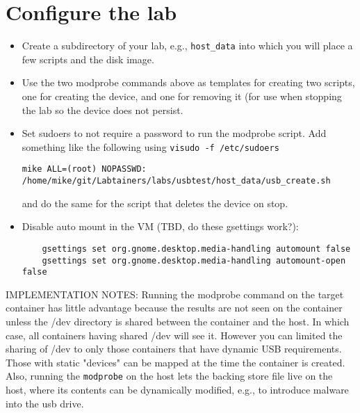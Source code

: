 \documentclass[12pt]{article}
\begin{document}
\section{Configure the lab}
\begin{itemize}
\item Create a subdirectory of your lab, e.g., {\tt host\_data} into which you will place a few scripts and the disk image.
\item Use the two modprobe commands above as templates for creating two scripts, one for creating the device, and one for removing it (for use
when stopping the lab so the device does not persist.
\item Set sudoers to not require a password to run the modprobe script.  Add
something like the following using {\tt visudo -f /etc/sudoers}
\begin{verbatim}
mike ALL=(root) NOPASSWD: /home/mike/git/Labtainers/labs/usbtest/host_data/usb_create.sh
\end{verbatim}
\noindent and do the same for the script that deletes the device on stop.

\item Disable auto mount in the VM (TBD, do these gsettings work?):
\begin{verbatim}
    gsettings set org.gnome.desktop.media-handling automount false
    gsettings set org.gnome.desktop.media-handling automount-open false 
\end{verbatim}

\end{itemize}

IMPLEMENTATION NOTES:   Running the modprobe command on the target container has little advantage because the results
are not seen on the container unless the /dev directory is shared between the container and the host.  In which case,
all containers having shared /dev will see it.  However you can limited the sharing of /dev to only those containers
that have dynamic USB requirements.  Those with static "devices" can be mapped at the time the container is created.
Also, running the {\tt modprobe} on the host lets the backing store file live on the host, where its contents can be
dynamically modified, e.g., to introduce malware into the usb drive.
\end{document}
